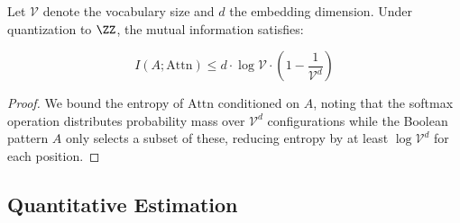 \begin{theorem}






Let $\mathcal{V}$ denote the vocabulary size and $d$ the embedding dimension. Under quantization to $\ZZ$, the mutual information satisfies:






$$






I(A; \text{Attn}) \leq d \cdot \log \mathcal{V} \cdot \left(1 - \frac{1}{\mathcal{V}^{d}} \right)






$$






\end{theorem}













\begin{proof}






We bound the entropy of $\text{Attn}$ conditioned on $A$, noting that the softmax operation distributes probability mass over $\mathcal{V}^d$ configurations while the Boolean pattern $A$ only selects a subset of these, reducing entropy by at least $\log \mathcal{V}^d$ for each position.






\end{proof}













\subsection{Quantitative Estimation}













